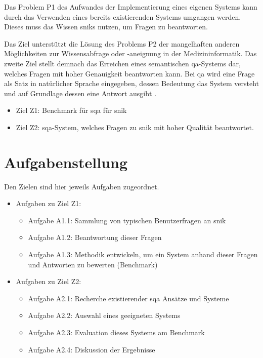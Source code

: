 Das Problem P1 des Aufwandes der Implementierung eines eigenen Systems kann durch das Verwenden eines bereits existierenden Systems umgangen werden.
Dieses muss das Wissen \acs{snik}s nutzen, um Fragen zu beantworten.

Das Ziel unterstützt die Lösung des Problems P2 der mangelhaften anderen Möglichkeiten zur Wissensabfrage oder -aneignung in der Medizininformatik.
Das zweite Ziel stellt demnach das Erreichen eines semantischen \acl*{qa}-Systems dar, welches Fragen mit hoher Genauigkeit beantworten kann.
Bei \acl*{qa} wird eine Frage als Satz in natürlicher Sprache eingegeben, dessen Bedeutung das System versteht und auf Grundlage dessen eine Antwort ausgibt \citep{qadefinition}.

\begin{itemize}
	\item Ziel Z1: Benchmark für \acl*{sqa} für \acs{snik}
	\item Ziel Z2: \acl*{sqa}-System, welches Fragen zu \acs{snik} mit hoher Qualität beantwortet.
\end{itemize}
\section{Aufgabenstellung}

Den Zielen sind hier jeweils Aufgaben zugeordnet.

\begin{itemize}

	\item Aufgaben zu Ziel Z1:
	\begin{itemize}
		\item Aufgabe A1.1: Sammlung von typischen Benutzerfragen an \acs{snik}
		\item Aufgabe A1.2: Beantwortung dieser Fragen
		\item Aufgabe A1.3: Methodik entwickeln, um ein System anhand dieser Fragen und Antworten zu bewerten (Benchmark)
	\end{itemize}
	\item Aufgaben zu Ziel Z2:
	\begin{itemize}
		\item Aufgabe A2.1: Recherche existierender \acl*{sqa} Ansätze und Systeme
		\item Aufgabe A2.2: Auswahl eines geeigneten Systems
		\item Aufgabe A2.3: Evaluation dieses Systems am Benchmark
		\item Aufgabe A2.4: Diskussion der Ergebnisse
	\end{itemize}
\end{itemize}

